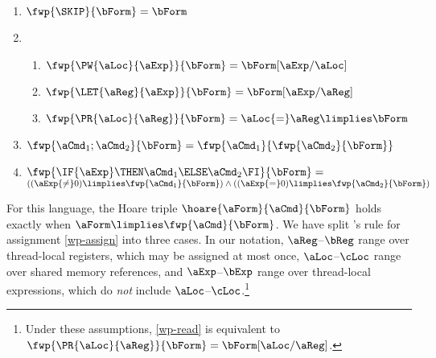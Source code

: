 \begin{multicols}{2}
  \begin{enumerate}[,label=(\textsc{d}\arabic*),ref=\textsc{d}\arabic*]
  \item
    \begin{math}
      \fwp{\SKIP}{\bForm} = \bForm
    \end{math}
  \item[] 
    \begin{enumerate}[leftmargin=0pt]
    \item \label{wp-write}
      $\fwp{\PW{\aLoc}{\aExp}}{\bForm} = \bForm[\aExp/\aLoc]$
    \item \label{wp-let}
      $\fwp{\LET{\aReg}{\aExp}}{\bForm} = \bForm[\aExp/\aReg]$
    \item \label{wp-read}
      $\fwp{\PR{\aLoc}{\aReg}}{\bForm} = \aLoc{=}\aReg\limplies\bForm$ %
    \end{enumerate}
  \item
    \begin{math}
      \fwp{\aCmd_1;\aCmd_2}{\bForm} = \fwp{\aCmd_1}{\fwp{\aCmd_2}{\bForm}}
    \end{math}
  \item
    \begin{math}
      \fwp{\IF{\aExp}\THEN \aCmd_1\ELSE \aCmd_2\FI}{\bForm}= {}
    \end{math}
    \\
    \begin{math}
      ((\aExp{\ne}0) \limplies \fwp{\aCmd_1}{\bForm}) \land
      ((\aExp{=}0) \limplies \fwp{\aCmd_2}{\bForm})
    \end{math}
  \end{enumerate}
\end{multicols}
For this language, the Hoare triple
$\hoare{\aForm}{\aCmd}{\bForm}$ holds exactly when $\aForm \limplies
\fwp{\aCmd}{\bForm}$.  We have split
\citeauthor{DBLP:journals/cacm/Dijkstra75}'s rule for assignment
\eqref{wp-assign} into three cases. In our notation,
$\aReg$--$\bReg$ range over thread-local registers, which may be assigned at
most once,
$\aLoc$--$\cLoc$ range over shared memory references, and
$\aExp$--$\bExp$ range over thread-local expressions, which do \emph{not}
include
$\aLoc$--$\cLoc$.\footnote{Under these assumptions, \eqref{wp-read} is
  equivalent to $\fwp{\PR{\aLoc}{\aReg}}{\bForm} = \bForm[\aLoc/\aReg]$.}

